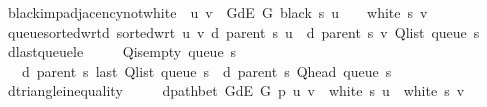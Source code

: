 \begin{isabellebody}
\ \ \ black{\isacharunderscore}{\kern0pt}imp{\isacharunderscore}{\kern0pt}adjacency{\isacharunderscore}{\kern0pt}not{\isacharunderscore}{\kern0pt}white{\isacharcolon}{\kern0pt}\ {\isachardoublequoteopen}{\isasymlbrakk}\ {\isacharparenleft}{\kern0pt}u{\isacharcomma}{\kern0pt}\ v{\isacharparenright}{\kern0pt}\ {\isasymin}\ G{\isachardot}{\kern0pt}dE\ G{\isacharsemicolon}{\kern0pt}\ black\ s\ u\ {\isasymrbrakk}\ {\isasymLongrightarrow}\ {\isasymnot}\ white\ s\ v{\isachardoublequoteclose}\isanewline
\ \ \ queue{\isacharunderscore}{\kern0pt}sorted{\isacharunderscore}{\kern0pt}wrt{\isacharunderscore}{\kern0pt}d{\isacharcolon}{\kern0pt}\ {\isachardoublequoteopen}sorted{\isacharunderscore}{\kern0pt}wrt\ {\isacharparenleft}{\kern0pt}{\isasymlambda}u\ v{\isachardot}{\kern0pt}\ d\ {\isacharparenleft}{\kern0pt}parent\ s{\isacharparenright}{\kern0pt}\ u\ {\isasymle}\ d\ {\isacharparenleft}{\kern0pt}parent\ s{\isacharparenright}{\kern0pt}\ v{\isacharparenright}{\kern0pt}\ {\isacharparenleft}{\kern0pt}Q{\isacharunderscore}{\kern0pt}list\ {\isacharparenleft}{\kern0pt}queue\ s{\isacharparenright}{\kern0pt}{\isacharparenright}{\kern0pt}{\isachardoublequoteclose}\isanewline
\ \ \ d{\isacharunderscore}{\kern0pt}last{\isacharunderscore}{\kern0pt}queue{\isacharunderscore}{\kern0pt}le{\isacharcolon}{\kern0pt}\isanewline
\ \ \ \ {\isachardoublequoteopen}{\isasymnot}\ Q{\isacharunderscore}{\kern0pt}is{\isacharunderscore}{\kern0pt}empty\ {\isacharparenleft}{\kern0pt}queue\ s{\isacharparenright}{\kern0pt}\ {\isasymLongrightarrow}\isanewline
\ \ \ \ \ d\ {\isacharparenleft}{\kern0pt}parent\ s{\isacharparenright}{\kern0pt}\ {\isacharparenleft}{\kern0pt}last\ {\isacharparenleft}{\kern0pt}Q{\isacharunderscore}{\kern0pt}list\ {\isacharparenleft}{\kern0pt}queue\ s{\isacharparenright}{\kern0pt}{\isacharparenright}{\kern0pt}{\isacharparenright}{\kern0pt}\ {\isasymle}\ d\ {\isacharparenleft}{\kern0pt}parent\ s{\isacharparenright}{\kern0pt}\ {\isacharparenleft}{\kern0pt}Q{\isacharunderscore}{\kern0pt}head\ {\isacharparenleft}{\kern0pt}queue\ s{\isacharparenright}{\kern0pt}{\isacharparenright}{\kern0pt}\ {\isacharplus}{\kern0pt}\ {}{\isachardoublequoteclose}\isanewline
\ \ \ d{\isacharunderscore}{\kern0pt}triangle{\isacharunderscore}{\kern0pt}inequality{\isacharcolon}{\kern0pt}\isanewline
\ \ \ \ {\isachardoublequoteopen}{\isasymlbrakk}\ dpath{\isacharunderscore}{\kern0pt}bet\ {\isacharparenleft}{\kern0pt}G{\isachardot}{\kern0pt}dE\ G{\isacharparenright}{\kern0pt}\ p\ u\ v{\isacharsemicolon}{\kern0pt}\ {\isasymnot}\ white\ s\ u{\isacharsemicolon}{\kern0pt}\ {\isasymnot}\ white\ s\ v\ {\isasymrbrakk}\ {\isasymLongrightarrow}\isanewline

\end{isabellebody}
